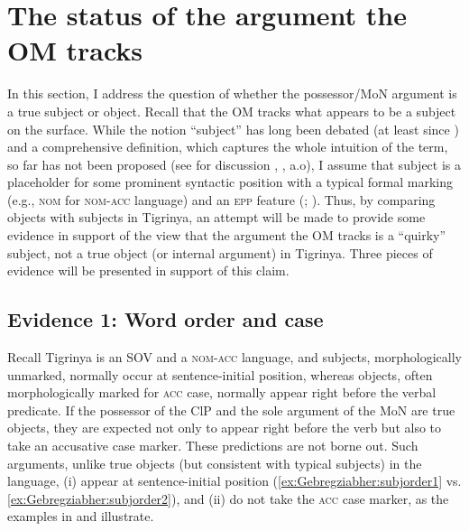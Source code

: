 \documentclass[output=paper]{langscibook}
\begin{document}
\section{The status of the argument the OM tracks}\label{ex:Gebregziabher:Why}\label{sec:gebregziabher:4}
In this section, I address the question of whether the possessor/MoN argument is a true subject or object. Recall that the OM tracks what appears to be a subject on the surface. While the notion ``subject'' has long been debated (at least since \citealt{keenan76}) and a comprehensive definition, which captures the whole intuition of the term, so far has not been proposed (see for discussion \citealt{mccloskey97}, \citealt{jaya2004}, a.o), I assume that subject is a placeholder for some prominent syntactic position with a typical formal marking (e.g., {\scshape nom} for {\scshape nom-acc} language) and an {\scshape epp} feature (\citealt{mccloskey97}; \citealt{chomsky2000}). Thus, by comparing objects with subjects in Tigrinya, an attempt will be made to provide some evidence in support of the view that the argument the OM tracks is a ``quirky'' subject, not a true object (or internal argument) in Tigrinya. Three pieces of evidence will be presented in support of this claim.
\subsection{Evidence 1: Word order and case} 

Recall Tigrinya is an SOV and a {\scshape nom-acc} language, and subjects, morphologically unmarked, normally occur at sentence-initial position, whereas objects, often morphologically marked for {\scshape acc} case, normally appear right before the verbal predicate. 
If the possessor of the ClP and the sole argument of the MoN are true objects, they are expected not only to appear right before the verb but also to take an accusative case marker. These predictions are not borne out.
Such arguments, unlike true objects (but consistent with typical subjects) in the language, (i) appear at sentence-initial position (\ref{ex:Gebregziabher:subjorder1} vs. \ref{ex:Gebregziabher:subjorder2}), and (ii) do not take the {\scshape acc} case marker, as the examples  in  and  illustrate.
\end{document}
